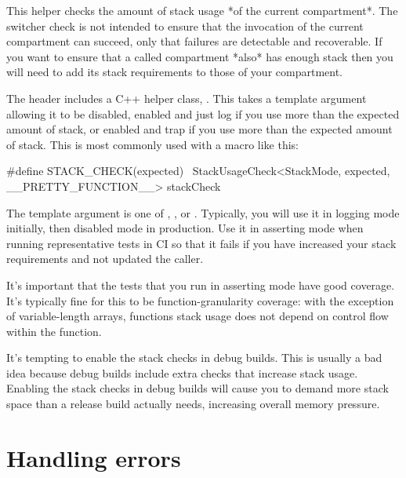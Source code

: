 
\begin{note}
This helper checks the amount of stack usage *of the current compartment*.
The switcher check is not intended to ensure that the invocation of the current compartment can succeed, only that failures are detectable and recoverable.
If you want to ensure that a called compartment *also* has enough stack then you will need to add its stack requirements to those of your compartment.
\end{note}

The  header includes a C++ helper class, .
This takes a template argument allowing it to be disabled, enabled and just log if you use more than the expected amount of stack, or enabled and trap if you use more than the expected amount of stack.
This is most commonly used with a macro like this:

\begin{cxxsnippet}
#define STACK_CHECK(expected) \ 
       StackUsageCheck<StackMode, expected, __PRETTY_FUNCTION__> stackCheck
\end{cxxsnippet}

The  template argument is one of , , or .
Typically, you will use it in logging mode initially, then disabled mode in production.
Use it in asserting mode when running representative tests in CI so that it fails if you have increased your stack requirements and not updated the caller.

It's important that the tests that you run in asserting mode have good coverage.
It's typically fine for this to be function-granularity coverage: with the exception of variable-length arrays, functions stack usage does not depend on control flow within the function.

\begin{caution}
It's tempting to enable the stack checks in debug builds.
This is usually a bad idea because debug builds include extra checks that increase stack usage.
Enabling the stack checks in debug builds will cause you to demand more stack space than a release build actually needs, increasing overall memory pressure.
\end{caution}

\section[label=handling_errors]{Handling errors}

